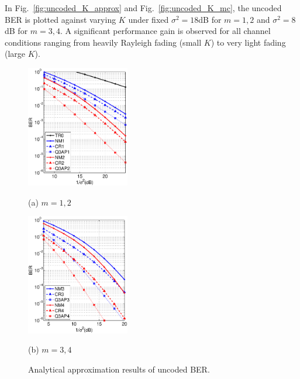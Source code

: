 \documentclass[journal]{IEEEtran}
\begin{document}
In Fig.~\ref{fig:uncoded_K_approx} and Fig.~\ref{fig:uncoded_K_mc}, the uncoded
BER is plotted against varying $K$ under fixed $\sigma^2 = 18$dB for $m=1,2$ and 
$\sigma^2 = 8$dB for $m=3,4$. A significant performance gain is observed for all
channel conditions ranging from heavily Rayleigh fading (small $K$) to very
light fading (large $K$).
\begin{figure}[!t]
  \begin{minipage}[b]{.48\linewidth}
    \centering
    \centerline{\includegraphics[width=4.5cm]{./figs/BER_noise_power_upperbound_64QAM_12.eps}}
    \centerline{(a) $m=1,2$}\medskip
  \end{minipage}
  \hfill
  \begin{minipage}[b]{0.48\linewidth}
    \centering
    \centerline{\includegraphics[width=4.5cm]{./figs/BER_noise_power_upperbound_64QAM_34.eps}}
    \centerline{(b) $m=3,4$}\medskip
  \end{minipage}
  \vspace{-10pt}
  \caption{Analytical approximation results of uncoded BER.}
  \label{fig:uncoded_noisepower_approx}
\end{figure}
\end{document}
